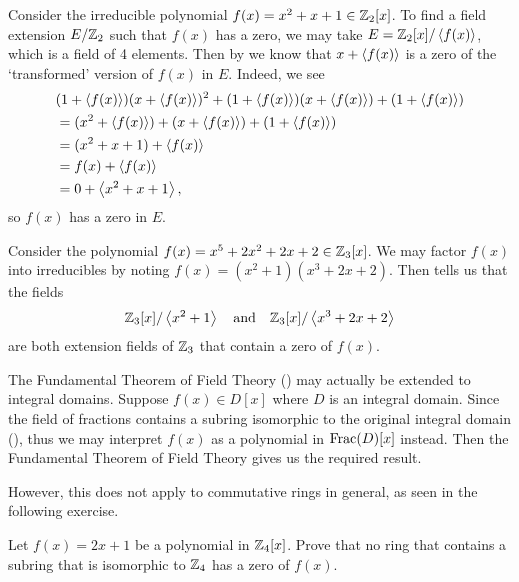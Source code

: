 \begin{example}
    Consider the irreducible polynomial $f(x) = x^2 + x + 1 \in \mathbb{Z}_2[x]$. To find a field extension $E/\mathbb{Z}_2$ such that $f(x)$ has a zero, we may take $E = \mathbb{Z}_2[x]/\left\langle f(x)\right\rangle$, which is a field of 4 elements. Then by  we know that $x + \left\langle f(x)\right\rangle$ is a zero of the `transformed' version of $f(x)$ in $E$. Indeed, we see
    \begin{align*}
        &(1 + \left\langle f(x)\right\rangle)(x + \left\langle f(x)\right\rangle)^2 + (1 + \left\langle f(x)\right\rangle)(x + \left\langle f(x)\right\rangle) + (1 + \left\langle f(x)\right\rangle)\\
        &= (x^2+\left\langle f(x)\right\rangle) + (x + \left\langle f(x)\right\rangle) + (1 + \left\langle f(x)\right\rangle)\\
        &= (x^2 + x + 1) + \left\langle f(x)\right\rangle\\
        &= f(x) + \left\langle f(x)\right\rangle\\
        &= 0 + \left\langle x^2+x+1\right\rangle,
    \end{align*}
    so $f(x)$ has a zero in $E$.
\end{example}

\begin{example}
    Consider the polynomial $f(x) = x^5 + 2x^2 + 2x + 2 \in \mathbb{Z}_3[x]$. We may factor $f(x)$ into irreducibles by noting $f(x) = (x^2+1)(x^3+2x+2)$. Then  tells us that the fields
    \[
        \mathbb{Z}_3[x]/\left\langle x^2+1\right\rangle \quad\text{and}\quad \mathbb{Z}_3[x]/\left\langle x^3+2x+2\right\rangle
    \]
    are both extension fields of $\mathbb{Z}_3$ that contain a zero of $f(x)$.
\end{example}

The Fundamental Theorem of Field Theory () may actually be extended to integral domains. Suppose $f(x) \in D[x]$ where $D$ is an integral domain. Since the field of fractions contains a subring isomorphic to the original integral domain (), thus we may interpret $f(x)$ as a polynomial in $\mathrm{Frac}(D)[x]$ instead. Then the Fundamental Theorem of Field Theory gives us the required result.

However, this does not apply to commutative rings in general, as seen in the following exercise.

\begin{exercise}
    Let $f(x) = 2x + 1$ be a polynomial in $\mathbb{Z}_4[x]$. Prove that no ring that contains a subring that is isomorphic to $\mathbb{Z}_4$ has a zero of $f(x)$.
\end{exercise}

